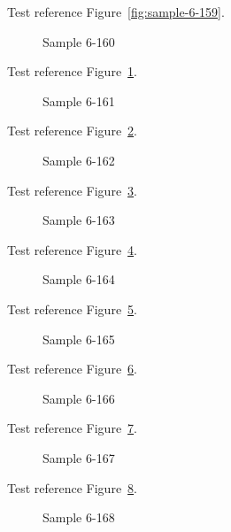 Test reference Figure~\ref{fig:sample-6-159}.

\begin{figure}[tbhp]
\caption{Sample 6-160}
\label{fig:sample-6-160}
\end{figure}

Test reference Figure~\ref{fig:sample-6-160}.

\begin{figure}[tbhp]
\caption{Sample 6-161}
\label{fig:sample-6-161}
\end{figure}

Test reference Figure~\ref{fig:sample-6-161}.

\begin{figure}[tbhp]
\caption{Sample 6-162}
\label{fig:sample-6-162}
\end{figure}

Test reference Figure~\ref{fig:sample-6-162}.

\begin{figure}[tbhp]
\caption{Sample 6-163}
\label{fig:sample-6-163}
\end{figure}

Test reference Figure~\ref{fig:sample-6-163}.

\begin{figure}[tbhp]
\caption{Sample 6-164}
\label{fig:sample-6-164}
\end{figure}

Test reference Figure~\ref{fig:sample-6-164}.

\begin{figure}[tbhp]
\caption{Sample 6-165}
\label{fig:sample-6-165}
\end{figure}

Test reference Figure~\ref{fig:sample-6-165}.

\begin{figure}[tbhp]
\caption{Sample 6-166}
\label{fig:sample-6-166}
\end{figure}

Test reference Figure~\ref{fig:sample-6-166}.

\begin{figure}[tbhp]
\caption{Sample 6-167}
\label{fig:sample-6-167}
\end{figure}

Test reference Figure~\ref{fig:sample-6-167}.

\begin{figure}[tbhp]
\caption{Sample 6-168}
\label{fig:sample-6-168}
\end{figure}

